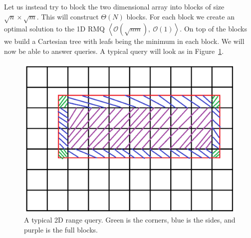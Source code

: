 \documentclass[a4paper,oneside,article,11pt]{memoir}
\begin{document}
Let us instead try to block the two dimensional array into blocks of size $\sqrt{n} \times \sqrt{m}$. This will construct $\Theta(N)$ blocks. For each block we create an optimal solution to the 1D RMQ $\left\langle \mathcal{O}(\sqrt{nm}),\ \mathcal{O}(1)\right\rangle$. On top of the blocks we build a Cartesian tree with leafs being the minimum in each block.
We will now be able to answer queries. A typical query will look as in Figure~\ref{fig:rmq_query}.

\begin{figure}[h!]
\includegraphics[width=\textwidth]{../figures/RMQ_query.png}
\caption{\label{fig:rmq_query}A typical 2D range query. Green is the corners, blue is the sides, and purple is the full blocks.}
\end{figure}
\end{document}
